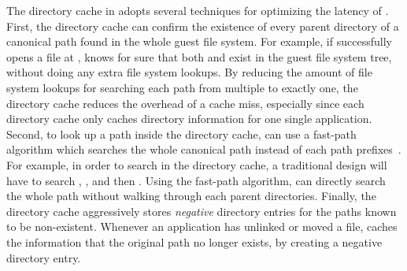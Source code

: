 The directory cache in \thelibos{} adopts several techniques for optimizing the latency of \linuxapis{}.
First, the directory cache
can confirm the existence of every parent directory
of a canonical path
found in the whole guest file system.
For example, if \thelibos{} successfully opens a file at ,
\thelibos{} knows for sure that both 
and  exist in the guest file system tree,
without doing any extra file system lookups.
By reducing the amount of file system lookups for searching each path
from multiple to exactly one,
the directory cache reduces the overhead of a cache miss,
especially since each directory cache
only caches directory information for one single application.
Second, to look up a path inside the directory cache,
\thelibos{} can use a fast-path algorithm which searches the whole canonical path
instead of each path prefixes~\cite{tsai15dcache}.
For example, in order to search  in the directory cache,
a traditional design will have to search
, , and then .
Using the fast-path algorithm,
\thelibos{} can directly search the whole path without walking through each parent directories.
Finally, the directory cache aggressively stores {\em negative} directory entries
for the paths known to be non-existent.
Whenever an application has unlinked or moved a file, \thelibos{} caches the information that the original path no longer exists,
by creating a negative directory entry.





